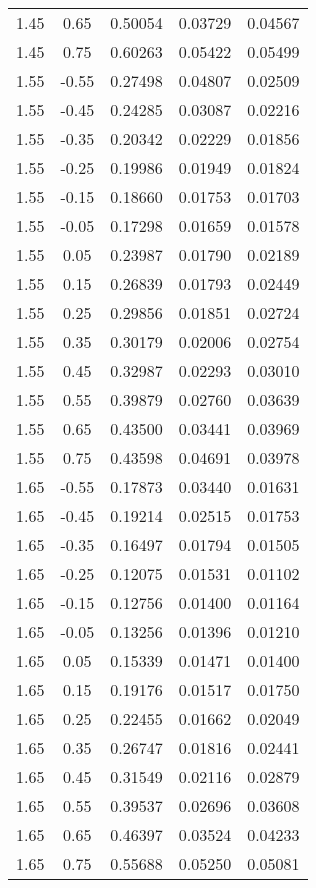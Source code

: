 \begin{longtable}{ccccc}
1.45 & 0.65 & 0.50054 & 0.03729 & 0.04567 \\ 
1.45 & 0.75 & 0.60263 & 0.05422 & 0.05499 \\ \hline
1.55 & -0.55 & 0.27498 & 0.04807 & 0.02509 \\ 
1.55 & -0.45 & 0.24285 & 0.03087 & 0.02216 \\ 
1.55 & -0.35 & 0.20342 & 0.02229 & 0.01856 \\ 
1.55 & -0.25 & 0.19986 & 0.01949 & 0.01824 \\ 
1.55 & -0.15 & 0.18660 & 0.01753 & 0.01703 \\ 
1.55 & -0.05 & 0.17298 & 0.01659 & 0.01578 \\ 
1.55 & 0.05 & 0.23987 & 0.01790 & 0.02189 \\ 
1.55 & 0.15 & 0.26839 & 0.01793 & 0.02449 \\ 
1.55 & 0.25 & 0.29856 & 0.01851 & 0.02724 \\ 
1.55 & 0.35 & 0.30179 & 0.02006 & 0.02754 \\ 
1.55 & 0.45 & 0.32987 & 0.02293 & 0.03010 \\ 
1.55 & 0.55 & 0.39879 & 0.02760 & 0.03639 \\ 
1.55 & 0.65 & 0.43500 & 0.03441 & 0.03969 \\ 
1.55 & 0.75 & 0.43598 & 0.04691 & 0.03978 \\ \hline
1.65 & -0.55 & 0.17873 & 0.03440 & 0.01631 \\ 
1.65 & -0.45 & 0.19214 & 0.02515 & 0.01753 \\ 
1.65 & -0.35 & 0.16497 & 0.01794 & 0.01505 \\ 
1.65 & -0.25 & 0.12075 & 0.01531 & 0.01102 \\ 
1.65 & -0.15 & 0.12756 & 0.01400 & 0.01164 \\ 
1.65 & -0.05 & 0.13256 & 0.01396 & 0.01210 \\ 
1.65 & 0.05 & 0.15339 & 0.01471 & 0.01400 \\ 
1.65 & 0.15 & 0.19176 & 0.01517 & 0.01750 \\ 
1.65 & 0.25 & 0.22455 & 0.01662 & 0.02049 \\ 
1.65 & 0.35 & 0.26747 & 0.01816 & 0.02441 \\ 
1.65 & 0.45 & 0.31549 & 0.02116 & 0.02879 \\ 
1.65 & 0.55 & 0.39537 & 0.02696 & 0.03608 \\ 
1.65 & 0.65 & 0.46397 & 0.03524 & 0.04233 \\ 
1.65 & 0.75 & 0.55688 & 0.05250 & 0.05081 \\ \hline

\end{longtable}
